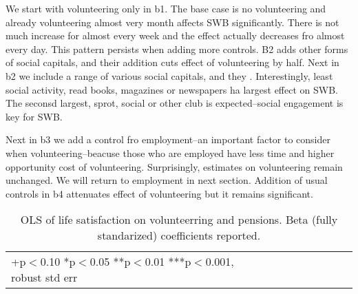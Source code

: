 \documentclass[10pt, letterpaper]{article}
\begin{document}
\begin{spacing}{1.4}
We start with  volunteering only in b1. The base case is no volunteering and
already volunteering almost very month affects SWB significantly. There is not
much increase for almost every week and the effect actually decreases fro almost
every day. This pattern persists when adding more controls. B2 adds other forms
of social capitals, and their addition cuts effect of volunteering by half.
%
Next in b2 we include a range of various social capitals, and they
. Interestingly, least social activity,  read books, magazines or newspapers ha
largest effect on SWB. The seconsd largest, sprot, social or other club is
expected--social engagement is key for SWB.

Next in b3 we add a control fro employment--an important factor to consider when
volunteering--beacuse those who are employed have less time and higher
opportunity cost of volunteering. Surprisingly, estimates on volunteering remain
unchanged. We will return to employment in next section.
Addition of usual controls in b4 attenuates effect of volunteering but it
remains significant.
 




\begin{spacing}{.9}
\begin{table}[H]\centering \caption{OLS of life satisfaction on volunteerring
    and pensions. Beta (fully standarized) coefficients reported. }  \begin{scriptsize} \begin{tabular}{p{1.8in}p{.5in}p{.5in}p{.5in}p{.5in}p{.5in}p{.5in}p{.5in}p{.5in}p{.5in}p{.4in}p{.5in}p{.4in}}\hline 
      \hline\multicolumn{5}{l}{+p$<$0.10 *p$<$0.05 **p$<$0.01 ***p$<$0.001,
        robust std err} \end{tabular}\label{regB} \end{scriptsize}\end{table}
\end{spacing}



\end{spacing}
\end{document}
